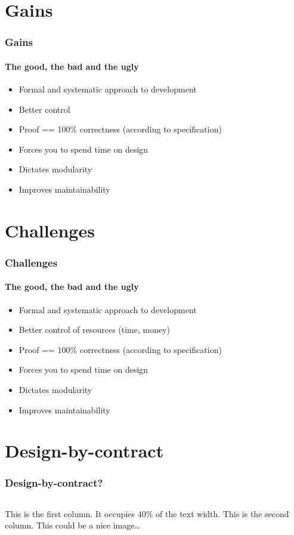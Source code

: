 \documentclass[presentation]{beamer}   %
\begin{document}
\section{Gains}
\begin{frame}
  \frametitle{Gains}
  \framesubtitle{The good, the bad and the ugly}
  \begin{itemize}
        \item Formal and systematic approach to development
        \item Better control
        \item Proof == 100\% correctness (according to specification)
        \item Forces you to spend time on design
        \item Dictates modularity
        \item Improves maintainability
      \end{itemize}       
\end{frame}

\section{Challenges}
\begin{frame}
  \frametitle{Challenges}
  \framesubtitle{The good, the bad and the ugly}
  \begin{itemize}
        \item Formal and systematic approach to development
        \item Better control of resources (time, money)
        \item Proof == 100\% correctness (according to specification)
        \item Forces you to spend time on design
        \item Dictates modularity
        \item Improves maintainability
      \end{itemize}       
\end{frame}


\section{Design-by-contract}
\begin{frame}
  \frametitle{Design-by-contract?}
  \begin{columns}[t] %
      This is the \alert{first} column. It occupies $40$\% of the text width.
      This is the \alert{second} column. This could be a nice image\ldots
      \begin{center}
        \rule{0.4\textwidth}{0.3\textwidth}
      \end{center}
  \end{columns}
\end{frame}
\end{document}
